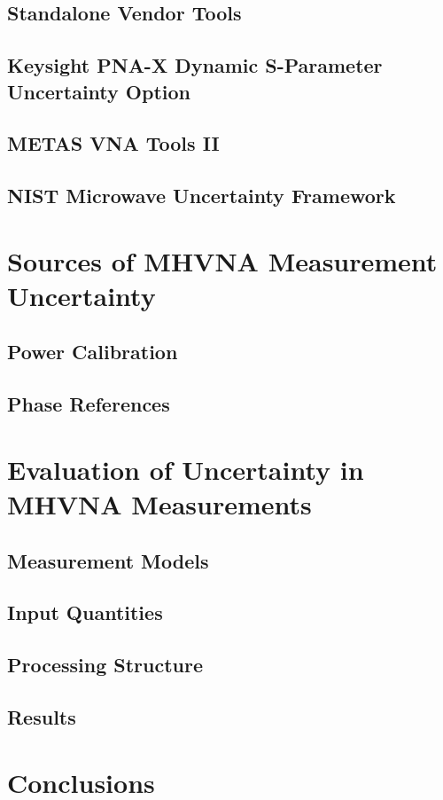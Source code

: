 \documentclass[../thesis/thesis.tex]{subfiles}
\begin{document}
\begin{refsection}
\subsection{Standalone Vendor Tools}
\subsection{Keysight PNA-X Dynamic S-Parameter Uncertainty Option}
\subsection{METAS VNA Tools II}
\subsection{NIST Microwave Uncertainty Framework}
\section{Sources of MHVNA Measurement Uncertainty}
\subsection{Power Calibration}
\subsection{Phase References}
\section{Evaluation of Uncertainty in MHVNA Measurements}
\subsection{Measurement Models}
\subsection{Input Quantities}
\subsection{Processing Structure}
\subsection{Results}
\section{Conclusions}
\printbibliography[title=References]
\end{refsection}
\end{document}
